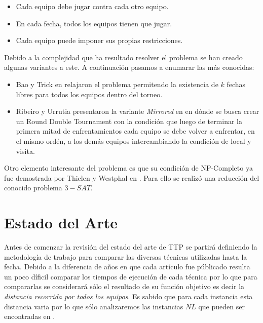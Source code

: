 \documentclass[letter, 10pt]{article}
\begin{document}
\begin{itemize}
    \item Cada equipo debe jugar contra cada otro equipo.
    \item En cada fecha, todos los equipos tienen que jugar.
    \item Cada equipo puede imponer sus propias restricciones.
\end{itemize}
    Debido a la complejidad que ha resultado resolver el problema se han creado algunas variantes a este. A continuación pasamos a enumarar las más conocidas:
\begin{itemize}
    \item Bao y Trick en \cite{Relaxed} relajaron el problema permitendo la existencia de $k$ fechas libres para todos los equipos dentro del torneo.
    \item Ribeiro y Urrutia presentaron la variante \emph{Mirrored} en \cite{Mirrored} en dónde se busca crear un Round Double Tournament con la condición que luego de terminar la primera mitad de enfrentamientos cada equipo se debe volver a enfrentar, en el mismo ordén, a los demás equipos intercambiando la condición de local y visita.
\end{itemize}
    Otro elemento interesante del problema es que su condición de NP-Completo ya fue demostrada por Thielen y Westphal en \cite{np-completo}. Para ello se realizó una reducción del conocido problema $3-SAT$.

\section{Estado del Arte}
    Antes de comenzar la revisión del estado del arte de TTP se partirá definiendo la metodología de trabajo para comparar las diversas técnicas utilizadas hasta la fecha. Debido a la diferencia de años en que cada artículo fue públicado resulta un poco díficil comparar los tiempos de ejecución de cada técnica por lo que para compararlas se considerará sólo el resultado de su función objetivo es decir la \emph{distancia recorrida por todos los equipos}. Es sabido que para cada instancia esta distancia varia por lo que sólo analizaremos las instancias $NL$ que pueden ser encontradas en \cite{Challeng85:online}.
    
\end{document}
